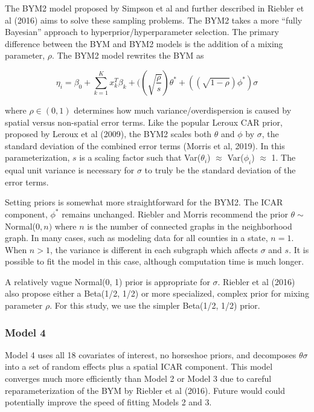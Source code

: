 \documentclass[
]{article}
\begin{document}
The BYM2 model proposed by Simpson et al and further described in
Riebler et al (2016) aims to solve these sampling problems. The BYM2
takes a more ``fully Bayesian'' approach to hyperprior/hyperparameter
selection. The primary difference between the BYM and BYM2 models is the
addition of a mixing parameter, \(\rho\). The BYM2 model rewrites the
BYM as

\[
\eta_i = \beta_0 + \sum_{k=1}^{K}x_k^T\beta_k + ((\sqrt{\frac{\rho}{s}})\theta^{*} + ((\sqrt{1-\rho})\phi^{*})\sigma
\]

where \(\rho \in (0, 1)\) determines how much variance/overdispersion is
caused by spatial versus non-spatial error terms. Like the popular
Leroux CAR prior, proposed by Leroux et al (2009), the BYM2 scales both
\(\theta\) and \(\phi\) by \(\sigma\), the standard deviation of the
combined error terms (Morris et al, 2019). In this parameterization,
\(s\) is a scaling factor such that Var(\(\theta_i\)) \(\approx\)
Var(\(\phi_i\)) \(\approx\) 1. The equal unit variance is necessary for
\(\sigma\) to truly be the standard deviation of the error terms.

Setting priors is somewhat more straightforward for the BYM2. The ICAR
component, \(\phi^{*}\) remains unchanged. Riebler and Morris recommend
the prior \(\theta \sim\) Normal(\(0, n)\) where \(n\) is the number of
connected graphs in the neighborhood graph. In many cases, such as
modeling data for all counties in a state, \(n=1\). When \(n>1\), the
variance is different in each subgraph which affects \(\sigma\) and
\(s\). It is possible to fit the model in this case, although
computation time is much longer.

A relatively vague Normal(0, 1) prior is appropriate for \(\sigma\).
Riebler et al (2016) also propose either a Beta(1/2, 1/2) or more
specialized, complex prior for mixing parameter \(\rho\). For this
study, we use the simpler Beta(1/2, 1/2) prior.

\hypertarget{model-4}{%
\subsubsection{Model 4}\label{model-4}}

Model 4 uses all 18 covariates of interest, no horseshoe priors, and
decomposes \(\theta\sigma\) into a set of random effects plus a spatial
ICAR component. This model converges much more efficiently than Model 2
or Model 3 due to careful reparameterization of the BYM by Riebler et al
(2016). Future would could potentially improve the speed of fitting
Models 2 and 3.
\end{document}

